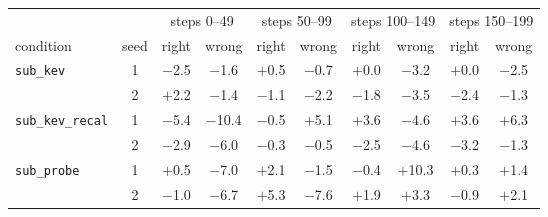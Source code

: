 \begin{tabular}{@{}lccccccccc@{}}
\toprule
 & & \multicolumn{2}{c}{steps 0--49} & \multicolumn{2}{c}{steps 50--99} & \multicolumn{2}{c}{steps 100--149} & \multicolumn{2}{c}{steps 150--199} \\ \cmidrule(l{2pt}r{2pt}){3-4}\cmidrule(l{2pt}r{2pt}){5-6}\cmidrule(l{2pt}r{2pt}){7-8}\cmidrule(l{2pt}r{2pt}){9-10}
condition & seed & right & wrong & right & wrong & right & wrong & right & wrong \\ \midrule
\texttt{sub\_kev} & 1 & $-$2.5 & $-$1.6 & $+$0.5 & $-$0.7 & $+$0.0 & $-$3.2 & $+$0.0 & $-$2.5 \\
 & 2 & $+$2.2 & $-$1.4 & $-$1.1 & $-$2.2 & $-$1.8 & $-$3.5 & $-$2.4 & $-$1.3 \\
\addlinespace
\texttt{sub\_kev\_recal} & 1 & $-$5.4 & $-$10.4 & $-$0.5 & $+$5.1 & $+$3.6 & $-$4.6 & $+$3.6 & $+$6.3 \\
 & 2 & $-$2.9 & $-$6.0 & $-$0.3 & $-$0.5 & $-$2.5 & $-$4.6 & $-$3.2 & $-$1.3 \\
\addlinespace
\texttt{sub\_probe} & 1 & $+$0.5 & $-$7.0 & $+$2.1 & $-$1.5 & $-$0.4 & $+$10.3 & $+$0.3 & $+$1.4 \\
 & 2 & $-$1.0 & $-$6.7 & $+$5.3 & $-$7.6 & $+$1.9 & $+$3.3 & $-$0.9 & $+$2.1 \\
\bottomrule
\end{tabular}
